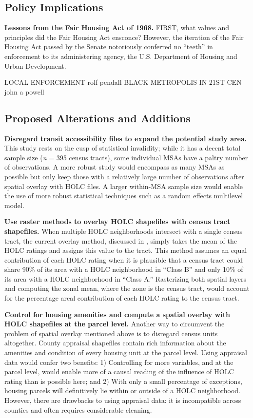 \documentclass[paper=letter, fontsize=12pt]{scrartcl} %
\begin{document}
\subsection{Policy Implications}
\textbf{Lessons from the Fair Housing Act of 1968.} FIRST, what values and principles did the Fair Housing Act ensconce? However, the iteration of the Fair Housing Act passed by the Senate notoriously conferred no ``teeth'' in enforcement to its administering agency, the U.S. Department of Housing and Urban Development. \par

LOCAL ENFORCEMENT rolf pendall BLACK METROPOLIS IN 21ST CEN john a powell



\subsection{Proposed Alterations and Additions}
\textbf{Disregard transit accessibility files to expand the potential study area.} This study rests on the cusp of statistical invalidity; while it has a decent total sample size (\textit{n} = 395 census tracts), some individual MSAs have a paltry number of observations. A more robust study would encompass as many MSAs as possible but only keep those with a relatively large number of observations after spatial overlay with HOLC files. A larger within-MSA sample size would enable the use of more robust statistical techniques such as a random effects multilevel model.\par
\textbf{Use raster methods to overlay HOLC shapefiles with census tract shapefiles.} When multiple HOLC neighborhoods intersect with a single census tract, the current overlay method, discussed in , simply takes the mean of the HOLC ratings and assigns this value to the tract. This method assumes an equal contribution of each HOLC rating when it is plausible that a census tract could share 90\% of its area with a HOLC neighborhood in ``Class B'' and only 10\% of its area with a HOLC neighborhood in ``Class A.'' Rasterizing both spatial layers and computing the zonal mean, where the zone is the census tract, would account for the percentage areal contribution of each HOLC rating to the census tract. \par
\textbf{Control for housing amenities and compute a spatial overlay with HOLC shapefiles at the parcel level.} Another way to circumvent the problem of spatial overlay mentioned above is to disregard census units altogether. County appraisal shapefiles contain rich information about the amenities and condition of every housing unit at the parcel level. Using appraisal data would confer two benefits: 1) Controlling for more variables, and at the parcel level, would enable more of a causal reading of the influence of HOLC rating than is possible here; and 2) With only a small percentage of exceptions, housing parcels will definitively lie within or outside of a HOLC neighborhood. However, there are drawbacks to using appraisal data: it is incompatible across counties and often requires considerable cleaning.
\end{document}
